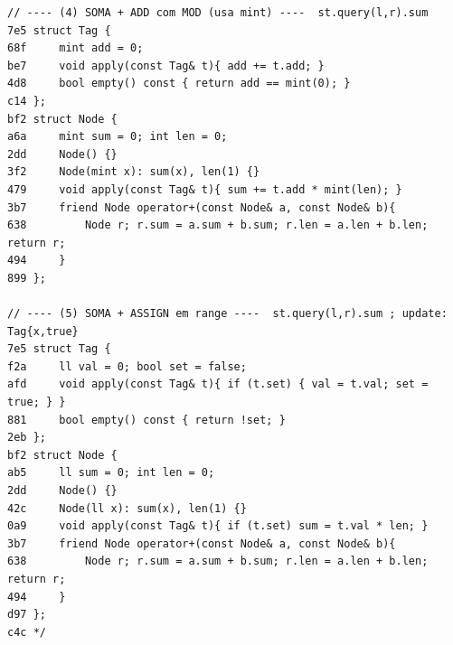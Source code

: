 \documentclass[11pt, a4paper, twoside]{article}
\begin{document}
\begin{lstlisting}
// ---- (4) SOMA + ADD com MOD (usa mint) ----  st.query(l,r).sum
7e5 struct Tag {
68f     mint add = 0;
be7     void apply(const Tag& t){ add += t.add; }
4d8     bool empty() const { return add == mint(0); }
c14 };
bf2 struct Node {
a6a     mint sum = 0; int len = 0;
2dd     Node() {}
3f2     Node(mint x): sum(x), len(1) {}
479     void apply(const Tag& t){ sum += t.add * mint(len); }
3b7     friend Node operator+(const Node& a, const Node& b){
638         Node r; r.sum = a.sum + b.sum; r.len = a.len + b.len; return r;
494     }
899 };

// ---- (5) SOMA + ASSIGN em range ----  st.query(l,r).sum ; update: Tag{x,true}
7e5 struct Tag {
f2a     ll val = 0; bool set = false;
afd     void apply(const Tag& t){ if (t.set) { val = t.val; set = true; } }
881     bool empty() const { return !set; }
2eb };
bf2 struct Node {
ab5     ll sum = 0; int len = 0;
2dd     Node() {}
42c     Node(ll x): sum(x), len(1) {}
0a9     void apply(const Tag& t){ if (t.set) sum = t.val * len; }
3b7     friend Node operator+(const Node& a, const Node& b){
638         Node r; r.sum = a.sum + b.sum; r.len = a.len + b.len; return r;
494     }
d97 };
c4c */
\end{lstlisting}
\end{document}
